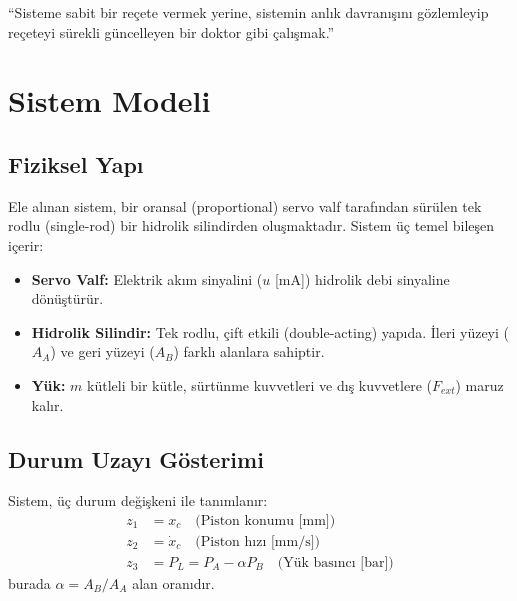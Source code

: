 \documentclass[12pt,a4paper]{article}
\begin{document}
\begin{kavram}
``Sisteme sabit bir reçete vermek yerine, sistemin anlık davranışını gözlemleyip reçeteyi sürekli güncelleyen bir doktor gibi çalışmak.''
\end{kavram}

\section{Sistem Modeli}
\label{sec:sistem}

\subsection{Fiziksel Yapı}

Ele alınan sistem, bir oransal (proportional) servo valf tarafından sürülen tek rodlu (single-rod) bir hidrolik silindirden oluşmaktadır. Sistem üç temel bileşen içerir:

\begin{itemize}
    \item \textbf{Servo Valf:} Elektrik akım sinyalini ($u$ [mA]) hidrolik debi sinyaline dönüştürür.
    \item \textbf{Hidrolik Silindir:} Tek rodlu, çift etkili (double-acting) yapıda. İleri yüzeyi ($A_A$) ve geri yüzeyi ($A_B$) farklı alanlara sahiptir.
    \item \textbf{Yük:} $m$ kütleli bir kütle, sürtünme kuvvetleri ve dış kuvvetlere ($F_{ext}$) maruz kalır.
\end{itemize}

\subsection{Durum Uzayı Gösterimi}

Sistem, üç durum değişkeni ile tanımlanır:
\begin{align}
    z_1 &= x_c \quad \text{(Piston konumu [mm])} \\
    z_2 &= \dot{x}_c \quad \text{(Piston hızı [mm/s])} \\
    z_3 &= P_L = P_A - \alpha P_B \quad \text{(Yük basıncı [bar])}
\end{align}
burada $\alpha = A_B / A_A$ alan oranıdır.
\end{document}
